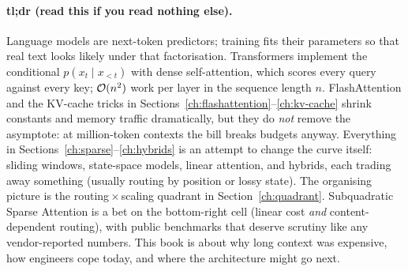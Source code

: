 \paragraph{tl;dr (read this if you read nothing else).}
Language models are next-token predictors; training fits their parameters so
that real text looks likely under that factorisation. Transformers implement
the conditional \(p(x_t \mid x_{<t})\) with dense self-attention, which scores
every query against every key; \(\mathcal{O}(n^2)\) work per layer in the sequence
length \(n\). FlashAttention and the KV-cache tricks in Sections~\ref{ch:flashattention}--\ref{ch:kv-cache} shrink constants
and memory traffic dramatically, but they do \emph{not} remove the asymptote:
at million-token contexts the bill breaks budgets anyway. Everything in Sections~\ref{ch:sparse}--\ref{ch:hybrids}
is an attempt to change the curve itself: sliding windows, state-space models,
linear attention, and hybrids, each trading away something (usually routing by
position or lossy state). The organising picture is the routing\,\(\times\)\,scaling
quadrant in Section~\ref{ch:quadrant}. Subquadratic Sparse Attention is a bet
on the bottom-right cell (linear cost \emph{and} content-dependent routing),
with public benchmarks that deserve scrutiny like any vendor-reported numbers.
This book is about why long context was expensive, how engineers cope today,
and where the architecture might go next.
